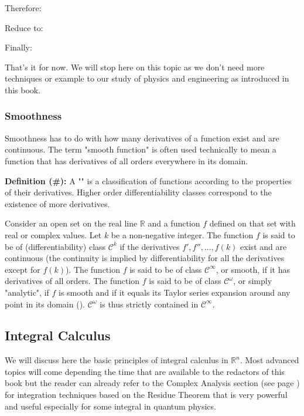 	Therefore:
	
	Reduce to:
	
	Finally:
	
	That's it for now. We will stop here on this topic as we don't need more techniques or example to our study of physics and engineering as introduced in this book.
	
		\pagebreak
		\subsubsection{Smoothness}\label{smoothness}
		 Smoothness has to do with how many derivatives of a function exist and are continuous. The term "smooth function" is often used technically to mean a function that has derivatives of all orders everywhere in its domain.
		 
		 \textbf{Definition  (\#\mydef):} A "" is a classification of functions according to the properties of their derivatives. Higher order differentiability classes correspond to the existence of more derivatives.
		 
		 Consider an open set on the real line $\mathbb{R}$ and a function $f$ defined on that set with real or complex values. Let $k$ be a non-negative integer. The function $f$ is said to be of (differentiability) class $\mathcal{C}^k$ if the derivatives $f', f'', ..., f(k)$ exist and are continuous (the continuity is implied by differentiability for all the derivatives except for $f(k)$). The function $f$ is said to be of class $\mathcal{C}^\infty$, or smooth, if it has derivatives of all orders. The function $f$ is said to be of class $\mathcal{C}^\omega$, or simply "analytic", if $f$ is smooth and if it equals its Taylor series expansion around any point in its domain (). $\mathcal{C}^\omega$ is thus strictly contained in $\mathcal{C}^\infty$.

		\pagebreak
		 \subsection{Integral Calculus}\label{integral calculus}
		 We will discuss here the basic principles of integral calculus in $\mathbb{R}^n$. Most advanced topics will come depending the time that are available to the redactors of this book but the reader can already refer to the Complex Analysis section (see page \pageref{complex analysis}) for integration techniques based on the Residue Theorem that is very powerful and useful especially for some integral in quantum physics.
		 
